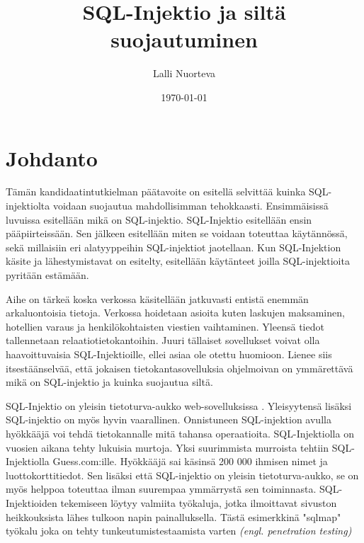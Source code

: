 \documentclass[finnish]{tktltiki2}
\title{SQL-Injektio ja siltä suojautuminen}
\author{Lalli Nuorteva}
\date{\today}
\theoremstyle{definition}
\theoremstyle{remark}
\begin{document}
	
	\frontmatter      %
	
	\maketitle        %
	
	\tableofcontents  %
	
	
	\mainmatter       %
	
	\section{Johdanto}
	Tämän kandidaatintutkielman päätavoite on esitellä selvittää kuinka SQL-injektiolta voidaan suojautua mahdollisimman tehokkaasti. Ensimmäisissä luvuissa esitellään mikä on SQL-injektio. SQL-Injektio esitellään ensin pääpiirteissään. Sen jälkeen esitellään miten se voidaan toteuttaa käytännössä, sekä millaisiin eri alatyyppeihin SQL-injektiot jaotellaan. Kun SQL-Injektion käsite ja lähestymistavat on esitelty, esitellään käytänteet joilla SQL-injektioita pyritään estämään.
	
	Aihe on tärkeä koska verkossa käsitellään jatkuvasti entistä enemmän arkaluontoisia tietoja. Verkossa hoidetaan asioita kuten laskujen maksaminen, hotellien varaus ja henkilökohtaisten viestien vaihtaminen. Yleensä tiedot tallennetaan relaatiotietokantoihin. Juuri tällaiset sovellukset voivat olla haavoittuvaisia SQL-Injektioille, ellei asiaa ole otettu huomioon. Lienee siis itsestäänselvää, että jokaisen tietokantasovelluksia ohjelmoivan on ymmärettävä mikä on SQL-injektio ja kuinka suojautua siltä.
	
	SQL-Injektio on yleisin tietoturva-aukko web-sovelluksissa \cite{detection}. Yleisyytensä lisäksi SQL-injektio on myös hyvin vaarallinen. Onnistuneen SQL-injektion avulla hyökkääjä voi tehdä tietokannalle mitä tahansa operaatioita. SQL-Injektiolla on vuosien aikana tehty lukuisia murtoja. Yksi suurimmista murroista tehtiin SQL-Injektiolla Guess.com:ille. Hyökkääjä sai käsinsä 200 000 ihmisen nimet ja luottokorttitiedot. Sen lisäksi että SQL-injektio on yleisin tietoturva-aukko, se on myös helppoa toteuttaa ilman suurempaa ymmärrystä sen toiminnasta. SQL-Injektioiden tekemiseen löytyy valmiita työkaluja, jotka ilmoittavat sivuston heikkouksista lähes tulkoon napin painalluksella. Tästä esimerkkinä "sqlmap" työkalu joka on tehty tunkeutumistestaamista varten \textit{(engl. penetration testing)}
	
\end{document}
